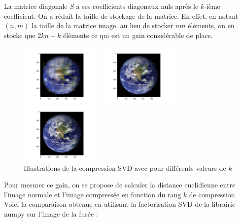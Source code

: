\documentclass{article}
\begin{document}
La matrice diagonale $S$ a ses coefficients diagonaux nuls après le $k$-ième coefficient.
On a réduit la taille de stockage de la matrice.
En effet, en notant $(n,m)$ la taille de la matrice image, au lieu de stocker $nm$ éléments, on en stocke que $2kn+k$ éléments ce qui est un gain considérable de place. \\
    

\begin{figure}[h]
   	\centering
   		\begin{minipage}[b]{0.25\linewidth}
		\centering \includegraphics[height=3cm]{compress_5}
		\caption{$k=5$}
	\end{minipage}
		\begin{minipage}[b]{0.25\linewidth}
		\centering \includegraphics[height=3cm]{compress_15}
		\caption{$k=15$}
	\end{minipage}
		\begin{minipage}[b]{0.25\linewidth}
		\centering \includegraphics[height=3cm]{compress_30}
		\caption{$k=30$}
	\end{minipage}\hfill
   	\caption{Illustrations de la compression SVD avec pour différents valeurs de $k$ }
   	\label{centre}
\end{figure}

Pour mesurer ce gain, on se propose de calculer la distance euclidienne entre l'image normale et l'image compressée en fonction du rang $k$ de compression. Voici la comparaison obtenue en utilisant la factorisation SVD de la librairie numpy sur l'image de la fusée : \\
\end{document}
